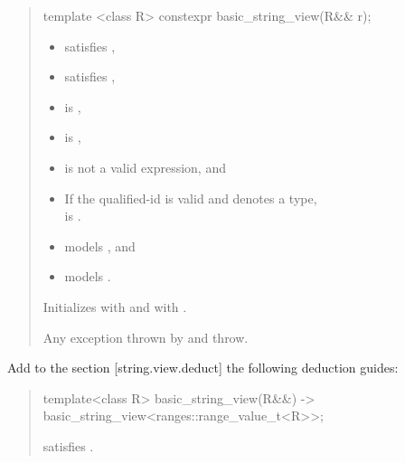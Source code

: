 \documentclass{wg21}
\begin{document}
\begin{quote}
\begin{addedblock}
\begin{itemdecl}
template <class R>
constexpr basic_string_view(R&& r);

\end{itemdecl}

\begin{itemdescr}
    \constraints
    \begin{itemize}
        \item {} satisfies ,
        \item {} satisfies ,
        \item {} is ,
        \item {} is ,
        \item {} is not a valid expression, and
        \item If the qualified-id  is valid and denotes a type,\\  is .
    \end{itemize}
 
	\preconditions
	 \begin{itemize}
		\item {} models , and
		\item {} models .
	\end{itemize}

    \effects
    Initializes  with  and  with .


    \throws
    Any exception thrown by  and  throw.



\end{itemdescr}

\end{addedblock}
\end{quote}


Add to the section [string.view.deduct] the following deduction guides:



\begin{quote}
\begin{addedblock}

\begin{itemdecl}
template<class R>
basic_string_view(R&&)
-> basic_string_view<ranges::range_value_t<R>>;
\end{itemdecl}
\begin{itemdescr}
\constraints
{} satisfies .
\end{itemdescr}

\end{addedblock}
\end{quote}
\end{document}
